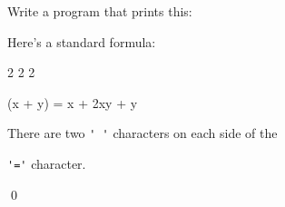 Write a program that prints this:

Here's a standard formula:

\begin{console}

       2      2          2

(x + y)   =  x  + 2xy + y

\end{console}

There are two \verb!' '! characters on each side of the 

\verb!'='! character.

\qed

